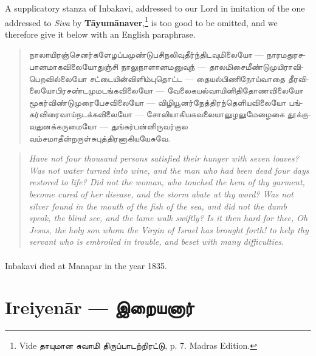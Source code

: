 \documentclass{article}
\newcommand{\TamilText}[1]{\texttamil{#1}}
\newcommand{\TamilBold}[1]{\texttamil{\textbf{#1}}}
\newcommand{\tam}[1]{\TamilText{#1}}
\newcommand{\tambold}[1]{\TamilBold{#1}}
\begin{document}
A supplicatory stanza of Inbakavi, addressed to our Lord in imitation of the one addressed to \emph{Siva} by \textbf{T\={a}yum\={a}naver},\footnote{Vide \tam{தாயுமான சுவாமி திருப்பாடற்றிரட்டு}, p. 7. Madras Edition.} is too good to be omitted, and we therefore give it below with an English paraphrase.
\begin{quotation}\small
\tam{நாலாயிரஞ்செனர்களேழப்பமுண்டுபசிநலிவுதீர்ந்திடவுமிலையோ} --- \tam{நாரமதுரசபானமாகவிலையோதுஞ்சி நாலுநாளானமனுவுந்} --- \tam{தாலமிசைமீண்டுமுயிராவிபெறவில்லையோ சட்டையின்விளிம்புதொட்ட} --- \tam{தையல்பிணிநோய்வாதை தீரவிலையோபிரசண்டமுமடங்கவிலையோ} --- \tam{வேலைகயல்வாயினிதிதோணவிலையோ மூகர்விண்டுமுரைபேசவிலையோ} --- \tam{விழியூனர்நேத்திரந்தெளியவிலையோ பங்கர்விரைவாய்‌நடக்கவிலையோ} --- \tam{சோலியாகியகவலையாலுழலுமேழைகை தூக்குவதுனக்கருமையோ} --- \tam{துங்கர்பன்னிருவர்குல வம்சமாதீன்றருள்சுபுத்‌திரனாகியயேசுவே}.
\end{quotation}
\begin{quotation}\small
\emph{Have not four thousand persons satisfied their hunger with seven loaves? Was not water turned into wine, and the man who had been dead four days restored to life? Did not the woman, who touched the hem of thy garment, become cured of her disease, and the storm abate at thy word? Was not silver found in the mouth of the fish of the sea, and did not the dumb speak, the blind see, and the lame walk swiftly? Is it then hard for thee, Oh Jesus, the holy son whom the Virgin of Israel has brought forth! to help thy servant who is embroiled in trouble, and beset with many difficulties.}
\end{quotation}
\paragraph{}
Inbakavi died at Manapar in the year 1835.

\section{Ireiyen\={a}r --- \tambold{இறையனார்}}
\end{document}
